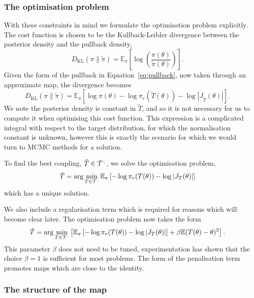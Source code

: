 \documentclass[final]{siamltex}
\newcommand{\ltri}{%
\,\resizebox{!}{0.25\baselineskip}{%
\begin{tikzpicture}%
\draw[line width=1mm](0,0) -- (0,2) -- (2,0)  -- (0,0);
\end{tikzpicture}%
}\xspace%
}%
\newcommand{\smallltri}{%
\,\resizebox{!}{0.15\baselineskip}{%
\begin{tikzpicture}%
\draw[line width=1mm](0,0) -- (0,2) -- (2,0)  -- (0,0);
\end{tikzpicture}%
}\xspace%
}%
\begin{document}
\subsubsection{The optimisation problem}

With these constraints in mind we formulate the optimisation problem explicitly. The cost function
is chosen to be the Kullback-Leibler divergence between the posterior density and the pullback density,
\[
	D_\text{KL}(\pi\|\tilde{\pi}) =
		\mathbb{E}_\pi\left[\log\left(\frac{\pi(\theta)}{\tilde{\pi}(\theta)}\right)\right].
\]
Given the form of the pullback in Equation~\eqref{eq:pullback}, now taken through an approximate map, the divergence becomes
\[
	D_\text{KL}(\pi\|\tilde{\pi}) = \mathbb{E}_\pi\left[\log\pi(\theta) - \log\pi_r(\tilde{T}(\theta)) -
		\log\left|J_{\tilde{T}}(\theta)\right|\right].
\]
We note the posterior density is constant in $\tilde{T}$, and so it is not necessary for us to compute it when optimising this cost function. This expression is a complicated integral with respect to the target distribution, for which the normalisation constant is unknown, however this is exactly the scenario for which we would turn to MCMC methods for a solution.

To find the best coupling, $\tilde{T} \in \mathcal{T}^{\ltri}$, we solve the optimisation problem,
\[
	\tilde{T} = \arg\min_{T \in \mathcal{T}^{\smallltri}} \mathbb{E}_\pi\left[-\log\pi_r(T(\theta)) -
		\log\left|J_T(\theta)\right|\right]
\]
which has a unique solution.

We also include a regularisation term which is required for reasons which will become clear later. The optimisation problem now takes the form
\begin{equation}\label{eq:gen_map_optim}
	\tilde{T} = \arg\min_{T\in\mathcal{T}^{\smallltri}} \left[
		 \mathbb{E}_\pi\left[-\log\pi_r(T(\theta)) -
		\log\left|J_T(\theta)\right|\right] + \beta\mathbb{E}(T(\theta)- \theta)^2 \right].
\end{equation}
This parameter $\beta$ does not need to be tuned, experimentation has shown that the choice
$\beta=1$ is sufficient for most problems. The form of the penalisation term promotes maps which are
close to the identity.

\subsubsection{The structure of the map}
\end{document}
